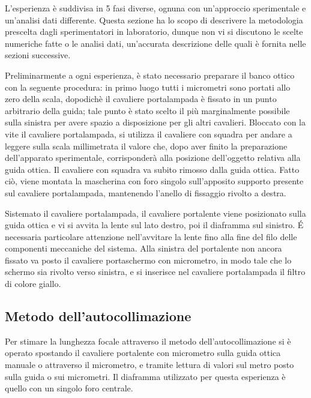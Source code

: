 L'esperienza \`e suddivisa in 5 fasi diverse, ognuna con 
un'approccio sperimentale e un'analisi dati differente. Questa 
sezione ha lo scopo di descrivere la metodologia prescelta dagli 
sperimentatori in laboratorio, dunque non vi si discutono le scelte 
numeriche fatte o le analisi dati, un'accurata descrizione delle 
quali è fornita nelle sezioni successive.

Preliminarmente a ogni esperienza, è stato necessario preparare il 
banco ottico con la seguente procedura: in primo luogo tutti i 
micrometri sono portati allo zero della scala, dopodichè il 
cavaliere portalampada \`e fissato in un punto arbitrario della 
guida; tale punto è stato scelto il più marginalmente possibile 
sulla sinistra per avere spazio a disposizione per gli altri 
cavalieri. Bloccato con la vite il cavaliere portalampada, si 
utilizza il cavaliere con squadra per andare a leggere sulla scala 
millimetrata il valore che, dopo aver finito la preparazione 
dell'apparato sperimentale, corrisponder\`a alla posizione 
dell'oggetto relativa alla guida ottica. Il cavaliere con squadra va 
subito rimosso dalla guida ottica. Fatto ciò, viene montata la 
mascherina con foro singolo sull'apposito supporto presente sul 
cavaliere portalampada, mantenendo l'anello di fissaggio rivolto a 
destra.

Sistemato il cavaliere portalampada, il cavaliere 
portalente viene posizionato sulla guida ottica e vi si avvita la 
lente sul lato destro, poi il diaframma sul sinistro. \'E necessaria 
particolare attenzione nell'avvitare la lente fino alla fine del 
filo delle componenti meccaniche del sistema. Alla sinistra del 
portalente non ancora fissato va posto il cavaliere portaschermo con 
micrometro, in modo tale che lo schermo sia rivolto verso sinistra, 
e si inserisce nel cavaliere portalampada il filtro di colore giallo.

\subsection{Metodo dell'autocollimazione}
Per stimare la lunghezza focale attraverso il metodo 
dell'autocollimazione si è operato spostando il cavaliere portalente 
con micrometro sulla guida ottica manuale o attraverso il 
micrometro, e tramite lettura di valori sul metro posto sulla guida 
o sui micrometri. Il diaframma utilizzato per questa esperienza è 
quello con un singolo foro centrale. 

